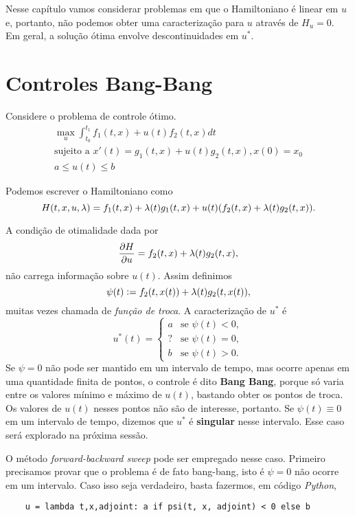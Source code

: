 Nesse capítulo vamos considerar problemas em que o Hamiltoniano é linear em
$u$ e, portanto, não podemos obter uma caracterização para $u$ através de $H_u
= 0$. Em geral, a solução ótima envolve descontinuidades em $u^*$.  

\section{Controles Bang-Bang}

Considere o problema de controle ótimo.
\begin{gather*}
    \max_u \int_{t_0}^{t_1} f_1(t,x) + u(t)f_2(t,x) dt \\ 
    \text{sujeito a  }x'(t) = g_1(t,x) + u(t)g_2(t,x), x(0) = x_0 \\
    a \leq u(t) \leq b 
\end{gather*}

Podemos escrever o Hamiltoniano como 
$$H(t,x,u,\lambda) = f_1(t,x) + \lambda(t) g_1(t,x) + u(t)(f_2(t,x) + \lambda(t) g_2(t,x)).$$

A condição de otimalidade dada por
$$
\frac{\partial H}{\partial u} = f_2(t,x) + \lambda(t)g_2(t,x), 
$$
não carrega informação sobre $u(t)$. Assim definimos 
$$\psi(t) := f_2(t,x(t)) + \lambda(t)g_2(t,x(t)),$$ muitas vezes chamada de \textit{função de troca}.  A caracterização
de $u^*$ é 
$$
u^*(t) = \begin{cases} 
    a &\text{se } \psi(t) < 0, \\
    ? &\text{se } \psi(t) = 0, \\
    b &\text{se } \psi(t) > 0. 
\end{cases}
$$
Se $\psi = 0$ não pode ser mantido em um intervalo de tempo, mas ocorre apenas
em uma quantidade finita de pontos, o controle é dito \textbf{Bang Bang},
porque só varia entre os valores mínimo e máximo de $u(t)$, bastando obter os
pontos de troca. Os valores de $u(t)$ nesses pontos não são de interesse,
portanto. Se $\psi(t) \equiv 0$ em um intervalo de tempo, dizemos que $u^*$ é \textbf{singular} nesse intervalo. Esse caso será explorado na próxima sessão. 

O método \textit{forward-backward sweep} pode ser empregado nesse caso.
Primeiro precisamos provar que o problema é de fato bang-bang, isto é $\psi =
0$ não ocorre em um intervalo.  Caso isso seja verdadeiro, basta
fazermos, em código \textit{Python}, 

\begin{verbatim}
    u = lambda t,x,adjoint: a if psi(t, x, adjoint) < 0 else b
\end{verbatim}

